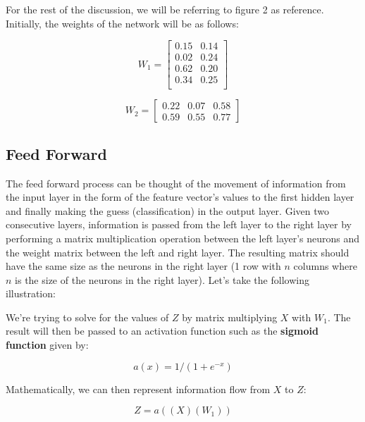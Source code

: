 \documentclass[a4paper]{article}
\begin{document}
For the rest of the discussion, we will be referring to figure 2 as reference. Initially, the weights of the network will be as follows:

\begin{equation}
  W_{1}=
    \begin{bmatrix}
      0.15  & 0.14 \\
      0.02  & 0.24 \\
      0.62  & 0.20 \\
      0.34  & 0.25 \\
    \end{bmatrix}
\end{equation}

\begin{equation}
  W_{2}=
    \begin{bmatrix}
      0.22 & 0.07 & 0.58 \\
      0.59 & 0.55 & 0.77
    \end{bmatrix}
\end{equation}


\subsection{Feed Forward}
The feed forward process can be thought of the movement of information from the input layer in the form of the feature vector's values to the first hidden layer and finally making the guess (classification) in the output layer. Given two consecutive layers, information is passed from the left layer to the right layer by performing a matrix multiplication operation between the left layer's neurons and the weight matrix between the left and right layer. The resulting matrix should have the same size as the neurons in the right layer (1 row with $n$ columns where $n$ is the size of the neurons in the right layer). Let's take the following illustration:

We're trying to solve for the values of $Z$ by matrix multiplying $X$ with $W_{1}$. The result will then be passed to an activation function such as the \textbf{sigmoid function} given by:

\begin{equation}
  a(x) = 1 / (1 + e^{-x})
\end{equation}

Mathematically, we can then represent information flow from $X$ to $Z$:

\begin{equation}
  Z=a((X)(W_{1}))
\end{equation}
\end{document}
